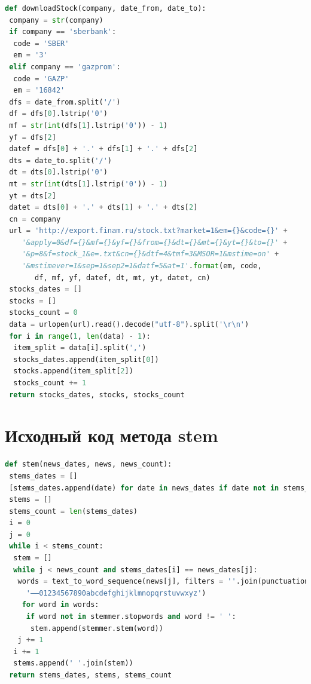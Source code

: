 \documentclass[14pt]{matmex-diploma-custom}
\begin{document}
\begin{appendices}
\begin{footnotesize}
\begin{lstlisting}[language=Python]
def downloadStock(company, date_from, date_to):
 company = str(company)
 if company == 'sberbank':
  code = 'SBER'
  em = '3'
 elif company == 'gazprom':
  code = 'GAZP'
  em = '16842'
 dfs = date_from.split('/')
 df = dfs[0].lstrip('0')
 mf = str(int(dfs[1].lstrip('0')) - 1)
 yf = dfs[2]
 datef = dfs[0] + '.' + dfs[1] + '.' + dfs[2]
 dts = date_to.split('/')
 dt = dts[0].lstrip('0')
 mt = str(int(dts[1].lstrip('0')) - 1)
 yt = dts[2]
 datet = dts[0] + '.' + dts[1] + '.' + dts[2]
 cn = company
 url = 'http://export.finam.ru/stock.txt?market=1&em={}&code={}' +
    '&apply=0&df={}&mf={}&yf={}&from={}&dt={}&mt={}&yt={}&to={}' +
    '&p=8&f=stock_1&e=.txt&cn={}&dtf=4&tmf=3&MSOR=1&mstime=on' +
    '&mstimever=1&sep=1&sep2=1&datf=5&at=1'.format(em, code, 
       df, mf, yf, datef, dt, mt, yt, datet, cn)
 stocks_dates = []
 stocks = []
 stocks_count = 0
 data = urlopen(url).read().decode("utf-8").split('\r\n')
 for i in range(1, len(data) - 1):
  item_split = data[i].split(',')
  stocks_dates.append(item_split[0])
  stocks.append(item_split[2])
  stocks_count += 1
 return stocks_dates, stocks, stocks_count
\end{lstlisting}
\end{footnotesize}

\section{Исходный код метода stem}

\label{app:stem}

\begin{footnotesize}
\begin{lstlisting}[language=Python]
def stem(news_dates, news, news_count):
 stems_dates = []
 [stems_dates.append(date) for date in news_dates if date not in stems_dates]
 stems = []
 stems_count = len(stems_dates)
 i = 0
 j = 0
 while i < stems_count:
  stem = []
  while j < news_count and stems_dates[i] == news_dates[j]:
   words = text_to_word_sequence(news[j], filters = ''.join(punctuation) + 
     '–—01234567890abcdefghijklmnopqrstuvwxyz')
    for word in words:
     if word not in stemmer.stopwords and word != ' ':
      stem.append(stemmer.stem(word))
   j += 1
  i += 1
  stems.append(' '.join(stem))
 return stems_dates, stems, stems_count
\end{lstlisting}
\end{footnotesize}


\end{appendices}
\end{document}
